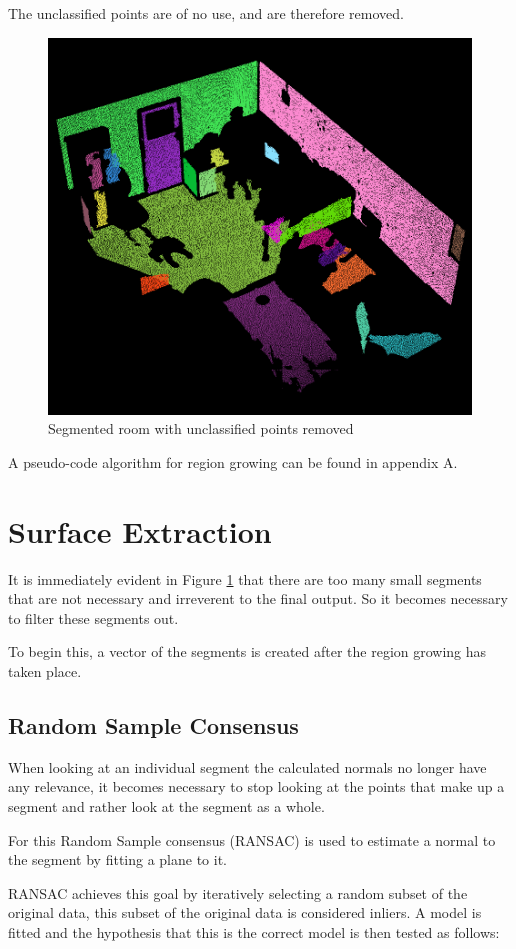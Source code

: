 		The unclassified points are of no use, and are therefore removed.
		
		
		\begin{figure}[H]
			\centering
			\includegraphics[width=0.6\linewidth]{Includes/images/RG-noUnclass}
			\caption{Segmented room with unclassified points removed}
			\label{fig:RG-noUnclass}
		\end{figure}
		
		A pseudo-code algorithm for region growing can be found in appendix A.
		
	
\section{Surface Extraction}
	It is immediately evident in Figure \ref{fig:RG-noUnclass} that there are too many small segments that are not necessary and irreverent to the final output. So it becomes necessary to filter these segments out.
	
	To begin this, a vector of the segments is created after the region growing has taken place.
	
		\subsection{Random Sample Consensus}
			When looking at an individual segment the calculated normals no longer have any relevance, it becomes necessary to stop looking at the points that make up a segment and rather look at the segment as a whole. 
			
			For this Random Sample consensus (RANSAC) is used to estimate a normal to the segment by fitting a plane to it.
			
			RANSAC achieves this goal by iteratively selecting a random subset of the original data, this subset of the original data is considered inliers. A model is fitted and the hypothesis that this is the correct model is then tested as follows:
			
